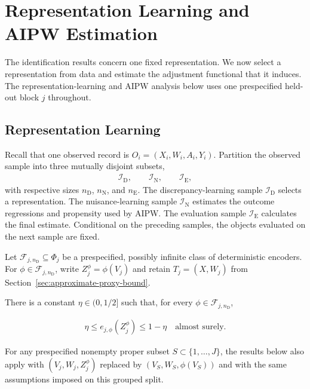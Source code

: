 \section{Representation Learning and AIPW Estimation}
\label{sec:estimation}

The identification results concern one fixed representation. We now select a representation from data and estimate the adjustment functional that it induces. The representation-learning and AIPW analysis below uses one prespecified held-out block $j$ throughout.

\subsection{Representation Learning}
\label{sec:representation-learning}

Recall that one observed record is $O_i=(X_i,W_i,A_i,Y_i)$. Partition the observed sample into three mutually disjoint subsets,
\begin{align}
	\mathcal I_{\mathrm D},
	\qquad
	\mathcal I_{\mathrm N},
	\qquad
	\mathcal I_{\mathrm E},
	\label{eq:honest-three-way-split}
\end{align}
with respective sizes $n_{\mathrm D}$, $n_{\mathrm N}$, and $n_{\mathrm E}$. The discrepancy-learning sample $\mathcal I_{\mathrm D}$ selects a representation. The nuisance-learning sample $\mathcal I_{\mathrm N}$ estimates the outcome regressions and propensity used by AIPW. The evaluation sample $\mathcal I_{\mathrm E}$ calculates the final estimate. Conditional on the preceding samples, the objects evaluated on the next sample are fixed.

 Let $\mathcal F_{j,n_{\mathrm D}}\subseteq\Phi_j$ be a prespecified, possibly infinite class of deterministic encoders. For $\phi\in\mathcal F_{j,n_{\mathrm D}}$, write $Z_j^\phi=\phi(V_j)$ and retain $T_j=(X,W_j)$ from Section~\ref{sec:approximate-proxy-bound}.

\begin{assumption}
\label{ass:library-overlap}
\normalfont
There is a constant $\eta\in(0,1/2]$ such that, for every $\phi\in\mathcal F_{j,n_{\mathrm D}}$,

\begin{align}
\eta\le e_{j,\phi}(Z_j^\phi)\le1-\eta\quad\text{almost surely}.
\label{eq:library-overlap}
\end{align}

\end{assumption}
For any prespecified nonempty proper subset $S\subset\{1,\ldots,J\}$, the results below also apply with $(V_j,W_j,Z_j^\phi)$ replaced by $(V_S,W_S,\phi(V_S))$ and with the same assumptions imposed on this grouped split.

